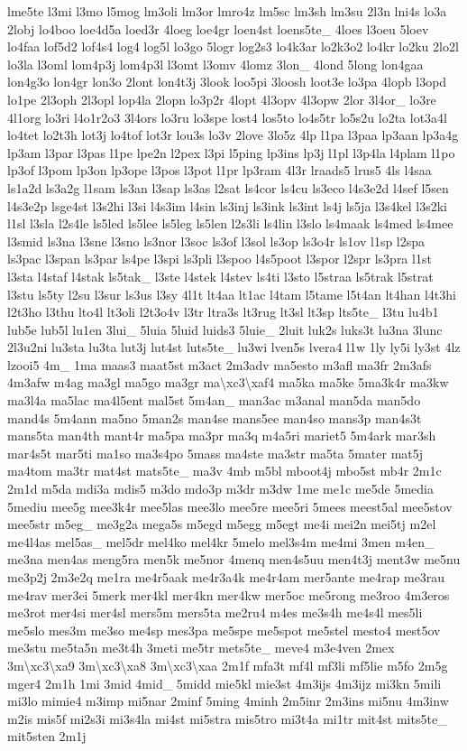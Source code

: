 \begin{DoxyCompactItemize}
lme5te l3mi l3mo l5mog lm3oli lm3or lmro4z lm5sc lm3sh lm3su 2l3n lni4s lo3a 2lobj lo4boo loe4d5a loed3r 4loeg loe4gr loen4st loens5te\-\_\- 4loes l3oeu 5loev lo4faa lof5d2 lof4s4 log4 log5l lo3go 5logr log2s3 lo4k3ar lo2k3o2 lo4kr lo2ku 2lo2l lo3la l3oml lom4p3j lom4p3l l3omt l3omv 4lomz 3lon\-\_\- 4lond 5long lon4gaa lon4g3o lon4gr lon3o 2lont lon4t3j 3look loo5pi 3loosh loot3e lo3pa 4lopb l3opd lo1pe 2l3oph 2l3opl lop4la 2lopn lo3p2r 4lopt 4l3opv 4l3opw 2lor 3l4or\-\_\- lo3re 4l1org lo3ri l4o1r2o3 3l4ors lo3ru lo3spe lost4 los5to lo4s5tr lo5s2u lo2ta lot3a4l lo4tet lo2t3h lot3j lo4tof lot3r lou3s lo3v 2love 3lo5z 4lp l1pa l3paa lp3aan lp3a4g lp3am l3par l3pas l1pe lpe2n l2pex l3pi l5ping lp3ins lp3j l1pl l3p4la l4plam l1po lp3of l3pom lp3on lp3ope l3pos l3pot l1pr lp3ram 4l3r lraads5 lrus5 4ls l4saa ls1a2d ls3a2g l1sam ls3an l3sap ls3as l2sat ls4cor ls4cu ls3eco l4s3e2d l4sef l5sen l4s3e2p lsge4st l3s2hi l3si l4s3im l4sin ls3inj ls3ink ls3int ls4j ls5ja l3s4kel l3s2ki l1sl l3sla l2s4le ls5led ls5lee ls5leg ls5len l2s3li ls4lin l3slo ls4maak ls4med ls4mee l3smid ls3na l3sne l3sno ls3nor l3soc ls3of l3sol ls3op ls3o4r ls1ov l1sp l2spa ls3pac l3span ls3par ls4pe l3spi ls3pli l3spoo l4s5poot l3spor l2spr ls3pra l1st l3sta l4staf l4stak ls5tak\-\_\- l3ste l4stek l4stev ls4ti l3sto l5straa ls5trak l5strat l3stu ls5ty l2su l3sur ls3us l3sy 4l1t lt4aa lt1ac l4tam l5tame l5t4an lt4han l4t3hi l2t3ho l3thu lto4l lt3oli l2t3o4v l3tr ltra3s lt3rug lt3sl lt3sp lts5te\-\_\- l3tu lu4b1 lub5e lub5l lu1en 3lui\-\_\- 5luia 5luid luids3 5luie\-\_\- 2luit luk2s luks3t lu3na 3lunc 2l3u2ni lu3sta lu3ta lut3j lut4st luts5te\-\_\- lu3wi lven5s lvera4 l1w 1ly ly5i ly3st 4lz lzooi5 4m\-\_\- 1ma maas3 maat5st m3act 2m3adv ma5esto m3afl ma3fr 2m3afs 4m3afw m4ag ma3gl ma5go ma3gr ma\textbackslash{}xc3\textbackslash{}xaf4 ma5ka ma5ke 5ma3k4r ma3kw ma3l4a ma5lac ma4l5ent mal5st 5m4an\-\_\- man3ac m3anal man5da man5do mand4s 5m4ann ma5no 5man2s man4se mans5ee man4so mans3p man4s3t mans5ta man4th mant4r ma5pa ma3pr ma3q m4a5ri mariet5 5m4ark mar3sh mar4s5t mar5ti ma1so ma3s4po 5mass ma4ste ma3str ma5ta 5mater mat5j ma4tom ma3tr mat4st mats5te\-\_\- ma3v 4mb m5bl mboot4j mbo5st mb4r 2m1c 2m1d m5da mdi3a mdis5 m3do mdo3p m3dr m3dw 1me me1c me5de 5media 5mediu mee5g mee3k4r mee5las mee3lo mee5re mee5ri 5mees meest5al mee5stov mee5str m5eg\-\_\- me3g2a mega5s m5egd m5egg m5egt me4i mei2n mei5tj m2el me4l4as mel5as\-\_\- mel5dr mel4ko mel4kr 5melo mel3s4m me4mi 3men m4en\-\_\- me3na men4as meng5ra men5k me5nor 4menq men4s5uu men4t3j ment3w me5nu me3p2j 2m3e2q me1ra me4r5aak me4r3a4k me4r4am mer5ante me4rap me3rau me4rav mer3ei 5merk mer4kl mer4kn mer4kw mer5oc me5rong me3roo 4m3eros me3rot mer4si mer4sl mers5m mers5ta me2ru4 m4es me3s4h me4s4l mes5li me5slo mes3m me3so me4sp mes3pa me5spe me5spot me5stel mesto4 mest5ov me3stu me5ta5n me3t4h 3meti me5tr mets5te\-\_\- meve4 m3e4ven 2mex 3m\textbackslash{}xc3\textbackslash{}xa9 3m\textbackslash{}xc3\textbackslash{}xa8 3m\textbackslash{}xc3\textbackslash{}xaa 2m1f mfa3t mf4l mf3li mf5lie m5fo 2m5g mger4 2m1h 1mi 3mid 4mid\-\_\- 5midd mie5kl mie3st 4m3ijs 4m3ijz mi3kn 5mili mi3lo mimie4 m3imp mi5nar 2minf 5ming 4minh 2m5inr 2m3ins mi5nu 4m3inw m2is mis5f mi2s3i mi3s4la mi4st mi5stra mis5tro mi3t4a mi1tr mit4st mits5te\-\_\- mit5sten 2m1j 
\end{DoxyCompactItemize}
